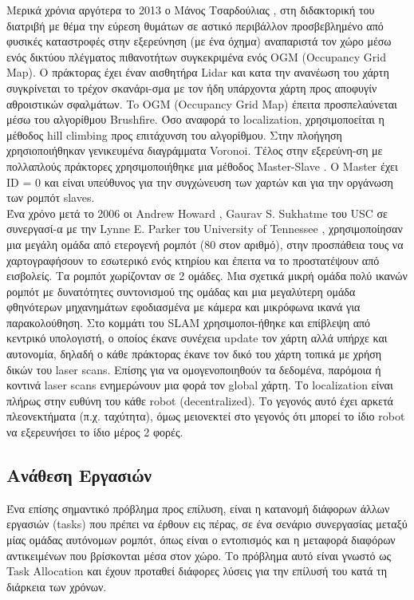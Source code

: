 	Μερικά χρόνια αργότερα το 2013 ο Μάνος Τσαρδούλιας \cite{2013},\cite{Tsardoulias2013} στη διδακτορική του διατριβή με θέμα την εύρεση θυμάτων σε αστικό περιβάλλον 
	προσβεβλημένο από φυσικές καταστροφές στην εξερεύνηση (με ένα όχημα) αναπαριστά τον χώρο μέσω ενός δικτύου πλέγματος πιθανοτήτων 
	συγκεκριμένα ενός OGM (Occupancy Grid Map). O πράκτορας έχει έναν αισθητήρα Lidar και κατα την ανανέωση του χάρτη συγκρίνεται το τρέχον σκανάρι-σμα 
	με τον ήδη υπάρχοντα χάρτη προς αποφυγίν αθροιστικών σφαλμάτων. To OGM (Occupancy Grid Map) έπειτα προσπελαύνεται μέσω του αλγορίθμου Brushfire. Όσο αναφορά 
	το localization, χρησιμοποείται η μέθοδος hill climbing προς επιτάχυνση του αλγορίθμου. Στην πλοήγηση χρησιοποιήθηκαν γενικευμένα 
	διαγράμματα Voronoi. Τέλος στην εξερεύνη-ση με πολλαπλούς πράκτορες χρησιμοποιήθηκε μια μέθοδος Master-Slave . 
	O Master έχει ID = 0 και είναι υπεύθυνος για την συγχώνευση των χαρτών και για την οργάνωση των ρομπότ slaves. \\
	
	Ένα χρόνο μετά το 2006 οι Andrew Howard , Gaurav S. Sukhatme του USC σε συνεργασί-α με την Lynne E. Parker του University of Tennessee \cite{Howard2006}, χρησιμοποίησαν 
	μια μεγάλη ομάδα από ετερογενή ρομπότ (80 στον αριθμό), στην προσπάθεια τους να χαρτογραφήσουν το εσωτερικό ενός κτηρίου και έπειτα να το 
	προστατέψουν από εισβολείς. Τα ρομπότ χωρίζονταν σε 2 ομάδες. Μια σχετικά μικρή ομάδα πολύ ικανών ρομπότ με δυνατότητες συντονισμού 
	της ομάδας και μια μεγαλύτερη ομάδα φθηνότερων μηχανημάτων εφοδιασμένα με κάμερα και μικρόφωνα ικανά για παρακολούθηση. Στο κομμάτι του 
	SLAM χρησιμοποι-ήθηκε και επίβλεψη από κεντρικό υπολογιστή, ο οποίος έκανε συνέχεια update τον χάρτη αλλά υπήρχε και αυτονομία, 
	δηλαδή ο κάθε πράκτορας έκανε τον δικό του χάρτη τοπικά με χρήση δικών του laser scans. Επίσης για να ομογενοποιηθούν τα δεδομένα, παρόμοια ή 
	κοντινά laser scans ενημερώνουν μια φορά τον global χάρτη. Το localization είναι πλήρως στην ευθύνη του κάθε robot (decentralized). 
	Το γεγονός αυτό έχει αρκετά πλεονεκτήματα (π.χ. ταχύτητα), όμως μειονεκτεί στο γεγονός ότι μπορεί το ίδιο robot να εξερευνήσει το 
	ίδιο μέρος 2 φορές.  \\
	
	
	\subsection{Ανάθεση Εργασιών}
	
	Ένα επίσης σημαντικό πρόβλημα προς επίλυση, είναι η κατανομή διάφορων άλλων εργασιών (tasks) που πρέπει να έρθουν εις πέρας, σε 
	ένα σενάριο συνεργασίας μεταξύ μίας ομάδας αυτόνομων ρομπότ, όπως είναι ο εντοπισμός και η μεταφορά διαφόρων αντικειμένων που βρίσκονται 
	μέσα στον χώρο. Το πρόβλημα αυτό είναι γνωστό ως Task Allocation και έχουν προταθεί διάφορες λύσεις για την επίλυσή του κατά τη 
	διάρκεια των χρόνων. \\
	
